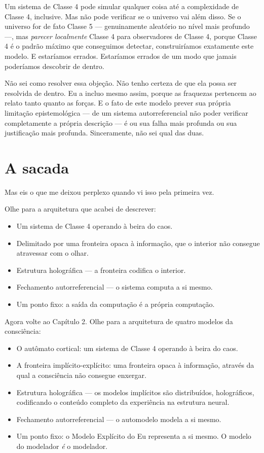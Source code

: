 \documentclass[11pt, twoside, openright]{book}
\begin{document}
Um sistema de Classe 4 pode simular qualquer coisa até a complexidade de Classe 4, inclusive. Mas não pode verificar se o universo vai além disso. Se o universo for de fato Classe 5 --- genuinamente aleatório no nível mais profundo ---, mas \textit{parecer localmente} Classe 4 para observadores de Classe 4, porque Classe 4 é o padrão máximo que conseguimos detectar, construiríamos exatamente este modelo. E estaríamos errados. Estaríamos errados de um modo que jamais poderíamos descobrir de dentro.

Não sei como resolver essa objeção. Não tenho certeza de que ela possa ser resolvida de dentro. Eu a incluo mesmo assim, porque as fraquezas pertencem ao relato tanto quanto as forças. E o fato de este modelo prever sua própria limitação epistemológica --- de um sistema autorreferencial não poder verificar completamente a própria descrição --- é ou sua falha mais profunda ou sua justificação mais profunda. Sinceramente, não sei qual das duas.


\section*{A sacada}

Mas eis o que me deixou perplexo quando vi isso pela primeira vez.

Olhe para a arquitetura que acabei de descrever:

\begin{itemize}
  \item Um sistema de Classe 4 operando à beira do caos.
  \item Delimitado por uma fronteira opaca à informação, que o interior não consegue atravessar com o olhar.
  \item Estrutura holográfica --- a fronteira codifica o interior.
  \item Fechamento autorreferencial --- o sistema computa a si mesmo.
  \item Um ponto fixo: a saída da computação é a própria computação.
\end{itemize}

Agora volte ao Capítulo 2. Olhe para a arquitetura de quatro modelos da consciência:

\begin{itemize}
  \item O autômato cortical: um sistema de Classe 4 operando à beira do caos.
  \item A fronteira implícito-explícito: uma fronteira opaca à informação, através da qual a consciência não consegue enxergar.
  \item Estrutura holográfica --- os modelos implícitos são distribuídos, holográficos, codificando o conteúdo completo da experiência na estrutura neural.
  \item Fechamento autorreferencial --- o automodelo modela a si mesmo.
  \item Um ponto fixo: o Modelo Explícito do Eu representa a si mesmo. O modelo do modelador \textit{é} o modelador.
\end{itemize}
\end{document}
